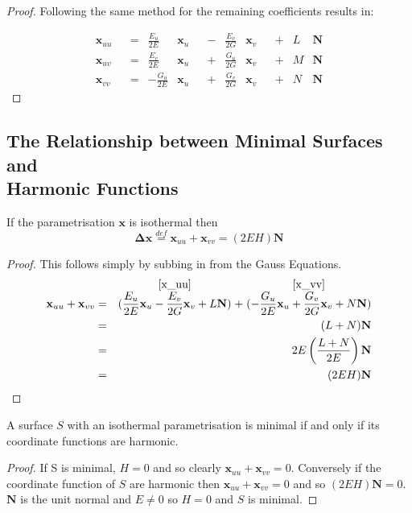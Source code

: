 \begin{proof}
Following the same method for the remaining coefficients results in:

\begin{align}
&\mathbf x_{uu}& &=& \frac{E_u}{2E} &\mathbf x_{u}& &-& \frac{E_v}{2G} &\mathbf x_{v}& &+& L &\mathbf N& \label {x_uu} \\
&\mathbf x_{uv}& &=& \frac{E_v}{2E} &\mathbf x_{u}& &+& \frac{G_u}{2G} &\mathbf x_{v}& &+& M &\mathbf N& \label{x_uv}\\
&\mathbf x_{vv}& &=& -\frac{G_u}{2E} &\mathbf x_{u}& &+& \frac{G_v}{2G} &\mathbf x_{v}& &+& N &\mathbf N& \label{x_vv}
\end{align}
\end{proof}

\subsection{The Relationship between Minimal Surfaces and \\ Harmonic Functions}
\begin{theorem}
If the parametrisation $\mathbf x$ is isothermal then 
\begin{displaymath}
\mathbf \Delta \mathbf x \stackrel{def}{=} \mathbf x_{uu} + \mathbf x_{vv} = (2EH)\mathbf N
\end{displaymath}
\end{theorem}

\begin{proof} 
This follows simply by subbing in from the Gauss Equations.
\begin{eqnarray}
\nonumber
\mathbf x_{uu} + \mathbf x_{vv} &=& \stackrel{\ref{x_uu}}{(\frac{E_u}{2E} \mathbf x_{u} - \frac{E_v}{2G} \mathbf x_{v} + L \mathbf N)} + \stackrel{\ref{x_vv}}{(-\frac{G_u}{2E} \mathbf x_{u} + \frac{G_v}{2G} \mathbf x_{v} + N \mathbf N)} 
\\
\nonumber
&=& (L+N)\mathbf N 
\\
\nonumber
&=& 2 E \left(\frac{L+N}{2E} \right)\mathbf N 
\\
\nonumber
&=& (2EH)\mathbf N
\end{eqnarray}
\end{proof}

\begin{cor}
A surface $S$ with an isothermal parametrisation is minimal if and only if its coordinate functions are harmonic.
\label{harmonic}
\end{cor}

\begin{proof}
If S is minimal, $H = 0$ and so clearly $\mathbf x_{uu} + \mathbf x_{vv} = 0$. Conversely if the coordinate function of $S$ are harmonic then $\mathbf x_{uu} + \mathbf x_{vv} = 0$ and so $(2EH) \mathbf N = 0$. $\mathbf N$ is the unit normal and $E \neq 0$ so $H=0$ and $S$ is minimal.
\end{proof}

